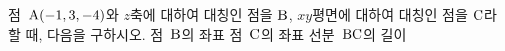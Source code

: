 점~$\mathrm{A}(-1{,}\mkern3mu\mathopen{}3{,}\mkern3mu\mathopen{}-4)$와 $z$축에 대하여 대칭인 점을 $\mathrm{B}$, $xy$평면에 대하여 대칭인 점을 $\mathrm{C}$라 할 때, 다음을 구하시오.
 점~$\mathrm{B}$의 좌표
 점~$\mathrm{C}$의 좌표
 선분~$\mathrm{BC}$의 길이
